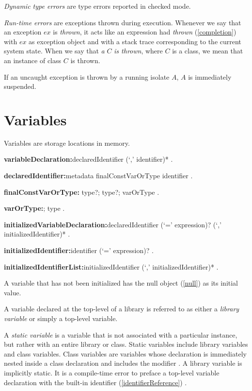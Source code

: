 \documentclass{article}
\begin{document}
\LMHash{}
{\em Dynamic type errors} are type errors reported in checked mode.

\LMHash{}
{\em Run-time errors} are exceptions thrown during execution.
Whenever we say that an exception $ex$ is {\em thrown}, it acts like an expression had {\em thrown} (\ref{completion}) with $ex$ as exception object and with a stack trace corresponding to the current system state.
When we say that {\em a} $C$ {\em is thrown}, where $C$ is a class, we mean that an instance of class $C$ is thrown.

\LMHash{}
If an uncaught exception is thrown by a running isolate $A$, $A$ is immediately suspended.


\section{Variables}

\LMHash{}
Variables are storage locations in memory.

\begin{grammar}
{\bf variableDeclaration:}declaredIdentifier (`,' identifier)*
  .

{\bf declaredIdentifier:}metadata finalConstVarOrType identifier
  .

{\bf finalConstVarOrType:}\FINAL{} type?;
  \CONST{} type?;
  varOrType
  .

{\bf varOrType:}\VAR{};
  type
  .

{\bf initializedVariableDeclaration:}declaredIdentifier (`=' expression)? (`,' initializedIdentifier)*
  .

{\bf initializedIdentifier:}identifier (`=' expression)?
  .

{\bf initializedIdentifierList:}initializedIdentifier (`,' initializedIdentifier)*
  .
\end{grammar}

\LMHash{}
A variable that has not been initialized has the null object (\ref{null}) as its initial value.

\LMHash{}
A variable declared at the top-level of a library is referred to as either a {\em library variable} or simply a top-level variable.

\LMHash{}
A {\em static variable} is a variable that is not associated with a particular instance, but rather with an entire library or class.
Static variables include library variables and class variables.
Class variables are variables whose declaration is immediately nested inside a class declaration and includes the modifier \STATIC{}.
A library variable is implicitly static.
It is a compile-time error to preface a top-level variable declaration with the built-in identifier (\ref{identifierReference}) \STATIC{}.
\end{document}
